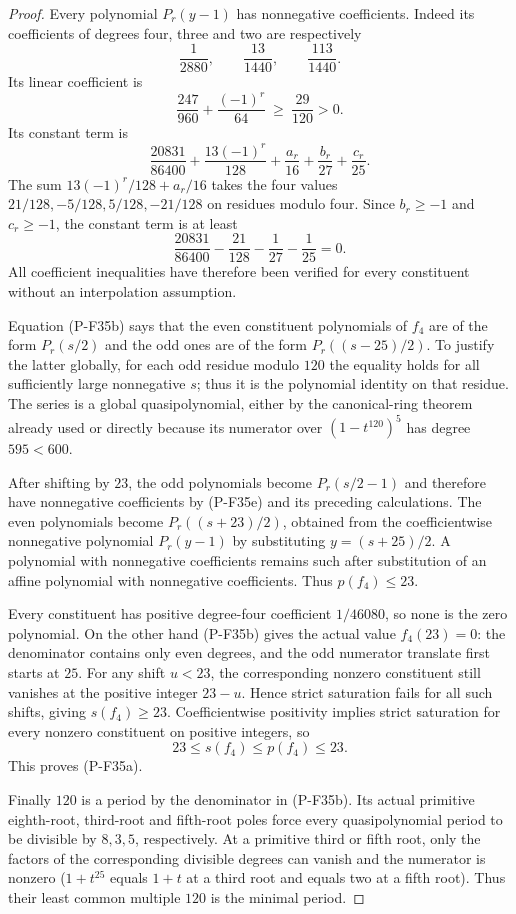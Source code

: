 \documentclass[11pt,a4paper]{article}
\begin{document}
\begin{proof}
Every polynomial $P_r(y-1)$ has nonnegative coefficients.
Indeed its coefficients of degrees four, three and two are
respectively
\[
              \frac1{2880},\qquad\frac{13}{1440},
                       \qquad\frac{113}{1440}.
\]
Its linear coefficient is
\[
             \frac{247}{960}+\frac{(-1)^r}{64}
                     \ \ge\ \frac{29}{120}>0.
\]
Its constant term is
\[
 \frac{20831}{86400}+\frac{13(-1)^r}{128}
                        +\frac{a_r}{16}+\frac{b_r}{27}
                        +\frac{c_r}{25}.
\]
The sum $13(-1)^r/128+a_r/16$ takes the four values
$21/128,-5/128,5/128,-21/128$ on residues modulo four.
Since $b_r\ge-1$ and $c_r\ge-1$, the constant term is at least
\[
 \frac{20831}{86400}-\frac{21}{128}-\frac1{27}-\frac1{25}=0.
 \tag{P-F35e}
\]
All coefficient inequalities have therefore been verified
for every constituent without an interpolation assumption.

Equation (P-F35b) says that the even constituent polynomials
of $f_4$ are of the form $P_r(s/2)$ and the odd ones are
of the form $P_r((s-25)/2)$. To justify the latter globally,
for each odd residue modulo $120$ the equality holds for
all sufficiently large nonnegative $s$; thus it is the
polynomial identity on that residue. The series is a global
quasipolynomial, either by the canonical-ring theorem already
used or directly because its numerator over $(1-t^{120})^5$
has degree $595<600$.

After shifting by $23$, the odd polynomials become
$P_r(s/2-1)$ and therefore have nonnegative coefficients
by (P-F35e) and its preceding calculations. The even
polynomials become $P_r((s+23)/2)$, obtained from the
coefficientwise nonnegative polynomial $P_r(y-1)$ by
substituting $y=(s+25)/2$. A polynomial with nonnegative
coefficients remains such after substitution of an affine
polynomial with nonnegative coefficients. Thus $p(f_4)\le23$.

Every constituent has positive degree-four coefficient
$1/46080$, so none is the zero polynomial. On the other
hand (P-F35b) gives the actual value $f_4(23)=0$:
the denominator contains only even degrees, and the odd
numerator translate first starts at $25$. For any shift
$u<23$, the corresponding nonzero constituent still
vanishes at the positive integer $23-u$. Hence strict
saturation fails for all such shifts, giving
$s(f_4)\ge23$. Coefficientwise positivity implies strict
saturation for every nonzero constituent on positive
integers, so
\[
                   23\le s(f_4)\le p(f_4)\le23.
\]
This proves (P-F35a).

Finally $120$ is a period by the denominator in (P-F35b).
Its actual primitive eighth-root, third-root and fifth-root
poles force every quasipolynomial period to be divisible
by $8,3,5$, respectively. At a primitive third or fifth root,
only the factors of the corresponding divisible degrees
can vanish and the numerator is nonzero ($1+t^{25}$ equals
$1+t$ at a third root and equals two at a fifth root).
Thus their least common multiple $120$ is the minimal period.
\end{proof}
\end{document}
